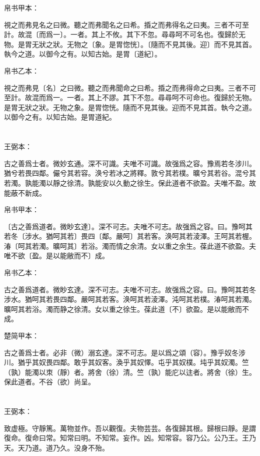 \documentclass[a5paper]{ctexbook}
\begin{document}
    
    帛书甲本：

    視之而弗見名之曰微。聽之而弗聞名之曰希。捪之而弗得名之曰夷。三者不可至計。故混〔而爲一〕。一者。其上不攸。其下不忽。尋尋呵不可名也。復歸於无物。是胃无狀之狀。无物之〔象。是胃惚恍〕。〔隨而不見其後。迎〕而不見其首。執今之道。以御今之有。以知古始。是胃〔道紀〕。

    帛书乙本：

    視之而弗見〔名〕之曰微。聽之而弗聞命之曰希。捪之而弗得命之曰夷。三者不可至計。故混而爲一。一者。其上不謬。其下不忽。尋尋呵不可命也。復歸於无物。是胃无狀之狀。无物之象。是胃惚恍。隨而不見其後。迎而不見其首。執今之道。以御今之有。以知古始。是胃道紀。

    \chapter{}
    王弼本：

    古之善爲士者。微妙玄通。深不可識。夫唯不可識。故强爲之容。豫焉若冬涉川。猶兮若畏四鄰。儼兮其若容。涣兮若冰之將釋。敦兮其若樸。曠兮其若谷。混兮其若濁。孰能濁以靜之徐清。孰能安以久動之徐生。保此道者不欲盈。夫唯不盈。故能蔽不新成。

    
    帛书甲本：

    〔古之善爲道者。微眇玄達〕。深不可志。夫唯不可志。故强爲之容。曰。豫呵其若冬〔涉水。猶呵其若〕畏四〔鄰。嚴呵〕其若客。涣呵其若淩澤。王呵其若楃。湷〔呵其若濁。曠呵其〕若浴。濁而情之余清。女以重之余生。葆此道不欲盈。夫唯不欲〔盈。是以能敝而不〕成。

    帛书乙本：

    古之善爲道者。微眇玄達。深不可志。夫唯不可志。故强爲之容。曰。豫呵其若冬涉水。猶呵其若畏四鄰。嚴呵其若客。涣呵其若淩澤。沌呵其若樸。湷呵其若濁。曠呵其若浴。濁而静之徐清。女以重之徐生。葆此道〔不〕欲盈。是以能敝而不成。

    楚简甲本：

    古之善爲士者。必非（微）溺玄達。深不可志。是以爲之頌（容）。豫乎奴冬涉川。猶乎其奴畏四鄰。敢乎其奴客。渙乎其奴懌。屯乎其奴樸。坉乎其奴濁。竺（孰）能濁以朿（靜）者。將舍（徐）清。竺（孰）能庀以迬者。將舍（徐）生。保此道者。不谷（欲）尚呈。

    \chapter{}
    王弼本：

    致虚極。守靜篤。萬物並作。吾以觀復。夫物芸芸。各復歸其根。歸根曰靜。是謂復命。復命曰常。知常曰明。不知常。妄作。凶。知常容。容乃公。公乃王。王乃天。天乃道。道乃久。没身不殆。
\end{document}
